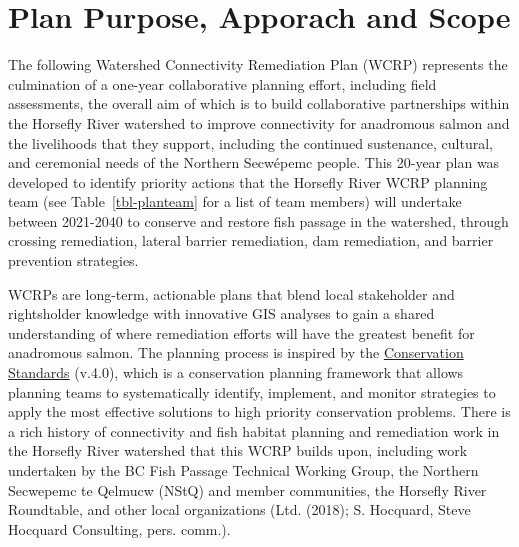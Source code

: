 \documentclass[
  letterpaper,
  DIV=11,
  numbers=noendperiod]{scrreprt}
\begin{document}

\hypertarget{plan-purpose-apporach-and-scope}{%
\chapter*{Plan Purpose, Apporach and
Scope}\label{plan-purpose-apporach-and-scope}}


The following Watershed Connectivity Remediation Plan (WCRP) represents
the culmination of a one-year collaborative planning effort, including
field assessments, the overall aim of which is to build collaborative
partnerships within the Horsefly River watershed to improve connectivity
for anadromous salmon and the livelihoods that they support, including
the continued sustenance, cultural, and ceremonial needs of the Northern
Secwépemc people. This 20-year plan was developed to identify priority
actions that the Horsefly River WCRP planning team (see
Table~\ref{tbl-planteam} for a list of team members) will undertake
between 2021-2040 to conserve and restore fish passage in the watershed,
through crossing remediation, lateral barrier remediation, dam
remediation, and barrier prevention strategies.

WCRPs are long-term, actionable plans that blend local stakeholder and
rightsholder knowledge with innovative GIS analyses to gain a shared
understanding of where remediation efforts will have the greatest
benefit for anadromous salmon. The planning process is inspired by the
\href{https://cmp-openstandards.org/wp-content/uploads/2020/07/CMP-Open-Standards-for-the-Practice-of-Conservation-v4.0.pdf}{Conservation
Standards} (v.4.0), which is a conservation planning framework that
allows planning teams to systematically identify, implement, and monitor
strategies to apply the most effective solutions to high priority
conservation problems. There is a rich history of connectivity and fish
habitat planning and remediation work in the Horsefly River watershed
that this WCRP builds upon, including work undertaken by the BC Fish
Passage Technical Working Group, the Northern Secwepemc te Qelmucw
(NStQ) and member communities, the Horsefly River Roundtable, and other
local organizations (Ltd. (2018); S. Hocquard, Steve Hocquard
Consulting, pers. comm.).
\end{document}
